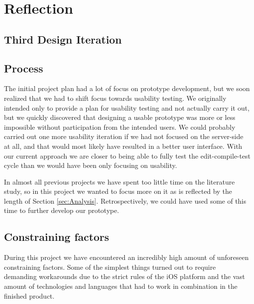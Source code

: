 \section{Reflection}
\label{sec:Reflection}

\subsection{Third Design Iteration}

\subsection{Process}
The initial project plan had a lot of focus on prototype development, but we
soon realized that we had to shift focus towards usability testing. We
originally intended only to provide a plan for usability testing and not
actually carry it out, but we quickly discovered that designing a usable prototype was more or less impossible without
participation from the intended users. We could probably carried out one more
usability iteration if we had not focused on the server-side at all, and that
would most likely have resulted in a better user interface. With our
current approach we are closer to being able to fully test the
edit-compile-test cycle than we would have been only focusing on usability.

In almost all previous projects we have spent too little time on the literature
study, so in this project we wanted to focus more on it as is reflected by the
length of Section \ref{sec:Analysis}. Retrospectively, we could have used some of this time to further develop our prototype. 

\subsection{Constraining factors}
During this project we have encountered an incredibly high amount of unforeseen constraining factors. Some of the simplest things turned out to require demanding workarounds due to the strict rules of the iOS platform and the vast amount of technologies and languages that had to work in combination in the finished product.

